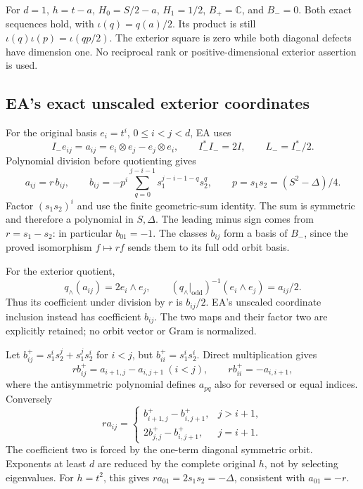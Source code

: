 For \(d=1\), \(h=t-a\), \(H_0=S/2-a\), \(H_1=1/2\), \(B_+=\mathbb C\), and \(B_-=0\). Both exact sequences hold, with \(\iota(q)=q(a)/2\). Its product is still \(\iota(q)\iota(p)=\iota(qp/2)\). The exterior square is zero while both diagonal defects have dimension one. No reciprocal rank or positive-dimensional exterior assertion is used.

\subsection{EA's exact unscaled exterior coordinates}

For the original basis \(e_i=t^i\), \(0\le i<j<d\), EA uses
\[
 I_-e_{ij}=a_{ij}=e_i\otimes e_j-e_j\otimes e_i,\qquad
 I_-^*I_-=2I,\qquad L_-=I_-^*/2.
 \tag{DE.23}
\]
Polynomial division before quotienting gives
\[
 a_{ij}=r\,b_{ij},\qquad
 b_{ij}=-p^i\sum_{q=0}^{j-i-1}s_1^{j-i-1-q}s_2^q,\qquad
 p=s_1s_2=(S^2-\Delta)/4.
 \tag{DE.24}
\]
Factor \((s_1s_2)^i\) and use the finite geometric-sum identity. The sum is symmetric and therefore a polynomial in \(S,\Delta\). The leading minus sign comes from \(r=s_1-s_2\): in particular \(b_{01}=-1\). The classes \(b_{ij}\) form a basis of \(B_-\), since the proved isomorphism \(f\mapsto rf\) sends them to its full odd orbit basis.

For the exterior quotient,
\[
 q_\wedge(a_{ij})=2e_i\wedge e_j,\qquad
 (q_\wedge|_{\mathrm{odd}})^{-1}(e_i\wedge e_j)=a_{ij}/2.
 \tag{DE.25}
\]
Thus its coefficient under division by \(r\) is \(b_{ij}/2\). EA's unscaled coordinate inclusion instead has coefficient \(b_{ij}\). The two maps and their factor two are explicitly retained; no orbit vector or Gram is normalized.

Let \(b^+_{ij}=s_1^is_2^j+s_1^js_2^i\) for \(i<j\), but \(b^+_{ii}=s_1^is_2^i\). Direct multiplication gives
\[
 r b^+_{ij}=a_{i+1,j}-a_{i,j+1}\ (i<j),\qquad
 r b^+_{ii}=-a_{i,i+1},
 \tag{DE.26}
\]
where the antisymmetric polynomial defines \(a_{pq}\) also for reversed or equal indices. Conversely
\[
 r a_{ij}=
 \begin{cases}
 b^+_{i+1,j}-b^+_{i,j+1},&j>i+1,\\
 2b^+_{j,j}-b^+_{i,j+1},&j=i+1.
 \end{cases}
 \tag{DE.27}
\]
The coefficient two is forced by the one-term diagonal symmetric orbit. Exponents at least \(d\) are reduced by the complete original \(h\), not by selecting eigenvalues. For \(h=t^2\), this gives \(r a_{01}=2s_1s_2=-\Delta\), consistent with \(a_{01}=-r\).

